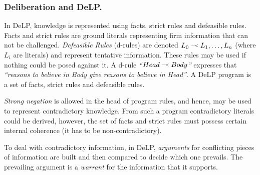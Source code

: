 





    
    
    


\subsubsection{Deliberation and DeLP.}
    \newcommand{\drule}[2]{\mbox{$ #1\; \defleftarrow \; #2$}}
    \newcommand{\defleftarrow}{{\raise1.5pt\hbox{\tiny\defleft}}}
    \newcommand{\defleft}{\mbox{---\hspace{-1.5pt}\raise.05pt\hbox{$<$}}}
    In DeLP\cite{Garcia:2004a}, knowledge is represented using facts, strict rules
    and defeasible rules. Facts and strict rules are ground literals representing
    firm information that can not be challenged. \textit{Defeasible Rules}
    (d-rules) are denoted $\drule{L_0}{L_1, \ldots, L_n}$ (where $L_i$ are literals)
    and represent tentative information. These rules may be used if nothing could
    be posed against it. A d-rule \textit{``\drule{Head}{Body}''} expresses that
    \textit{``reasons to believe in Body give reasons to believe in Head''}. A DeLP
    program is a set of facts, strict rules and defeasible rules. 

    {\it Strong negation} is allowed in the head of program rules, and hence, may
    be used to represent contradictory knowledge. From such a program contradictory
    literals could be derived, however,  the set of facts and strict rules must
    possess certain internal coherence (it has to be non-contradictory). 

    To deal with contradictory information, in DeLP, \emph{arguments} for
    conflicting pieces of information are built and then compared to decide which
    one prevails. The prevailing argument is a \emph{warrant} for the information
    that it supports.

